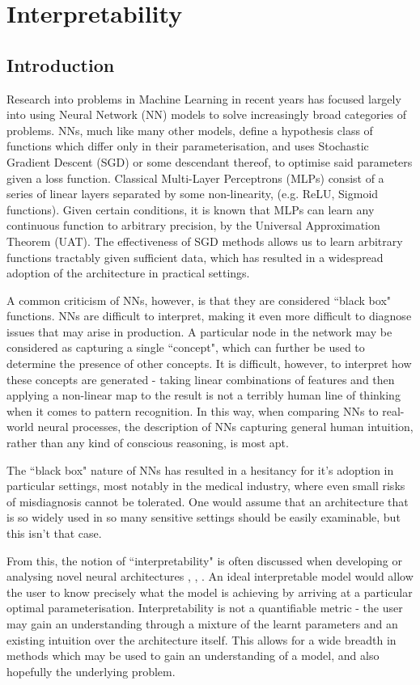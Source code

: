 \chapter{Interpretability}

\section{Introduction}

Research into problems in Machine Learning in recent years has focused largely into using Neural Network (NN) models to solve increasingly broad categories of problems. NNs, much like many other models, define a hypothesis class of functions which differ only in their parameterisation, and uses Stochastic Gradient Descent (SGD) or some descendant thereof, to optimise said parameters given a loss function. Classical Multi-Layer Perceptrons (MLPs) consist of a series of linear layers separated by some non-linearity, (e.g. ReLU, Sigmoid functions). Given certain conditions, it is known that MLPs can learn any continuous function to arbitrary precision, by the Universal Approximation Theorem (UAT). The effectiveness of SGD methods allows us to learn arbitrary functions tractably given sufficient data, which has resulted in a widespread adoption of the architecture in practical settings.

A common criticism of NNs, however, is that they are considered ``black box" functions. NNs are difficult to interpret, making it even more difficult to diagnose issues that may arise in production. A particular node in the network may be considered as capturing a single ``concept", which can further be used to determine the presence of other concepts. It is difficult, however, to interpret how these concepts are generated - taking linear combinations of features and then applying a non-linear map to the result is not a terribly human line of thinking when it comes to pattern recognition. In this way, when comparing NNs to real-world neural processes, the description of NNs capturing general human intuition, rather than any kind of conscious reasoning, is most apt.

The ``black box" nature of NNs has resulted in a hesitancy for it's adoption in particular settings, most notably in the medical industry, where even small risks of misdiagnosis cannot be tolerated. One would assume that an architecture that is so widely used in so many sensitive settings should be easily examinable, but this isn't that case.

From this, the notion of ``interpretability" is often discussed when developing or analysing novel neural architectures \cite{interpretbook}, \cite{gradientattribute}, \cite{interpretdeepmodels}. An ideal interpretable model would allow the user to know precisely what the model is achieving by arriving at a particular optimal parameterisation. Interpretability is not a quantifiable metric - the user may gain an understanding through a mixture of the learnt parameters and an existing intuition over the architecture itself. This allows for a wide breadth in methods which may be used to gain an understanding of a model, and also hopefully the underlying problem.

